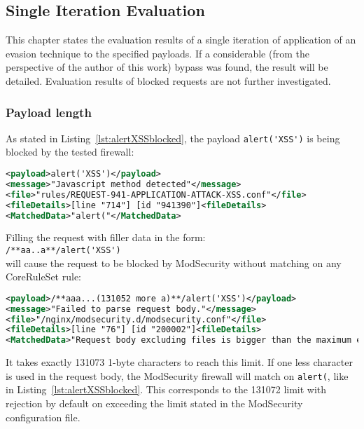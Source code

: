 \subsection{Single Iteration Evaluation}
\label{sec:singleiterationeva}
This chapter states the evaluation results of a single iteration of application of an evasion technique to the specified payloads. If a considerable (from the perspective of the author of this work) bypass was found, the result will be detailed. Evaluation results of blocked requests are not further investigated.


\subsubsection{Payload length}
As stated in Listing~\ref{lst:alertXSSblocked}, the payload \verb|alert('XSS')| is being blocked by the tested firewall:

\begin{lstlisting}[style=ruleStyle, language=XML, caption=alert('XSS'), label={lst:alertXSSblocked}]
<payload>alert('XSS')</payload>
<message>"Javascript method detected"</message>
<file>"rules/REQUEST-941-APPLICATION-ATTACK-XSS.conf"</file>
<fileDetails>[line "714"] [id "941390"]<fileDetails>
<MatchedData>"alert("</MatchedData>
\end{lstlisting}

Filling the request with filler data in the form: \\
\verb|/**aa..a**/alert('XSS')| \\
will cause the request to be blocked by ModSecurity without matching on any CoreRuleSet rule:

\begin{lstlisting}[style=ruleStyle, language=XML, caption=request body bigger than maximum, label={lst:requesttoobig}]
<payload>/**aaa...(131052 more a)**/alert('XSS')</payload>
<message>"Failed to parse request body."</message>
<file>"/nginx/modsecurity.d/modsecurity.conf"</file>
<fileDetails>[line "76"] [id "200002"]<fileDetails>
<MatchedData>"Request body excluding files is bigger than the maximum expected."</MatchedData>
\end{lstlisting}

It takes exactly 131073 1-byte characters to reach this limit. If one less character is used in the request body, the ModSecurity firewall will match on \verb|alert(|, like in Listing~\ref{lst:alertXSSblocked}. This corresponds to the 131072 limit with rejection by default on exceeding the limit stated in the ModSecurity configuration file.


